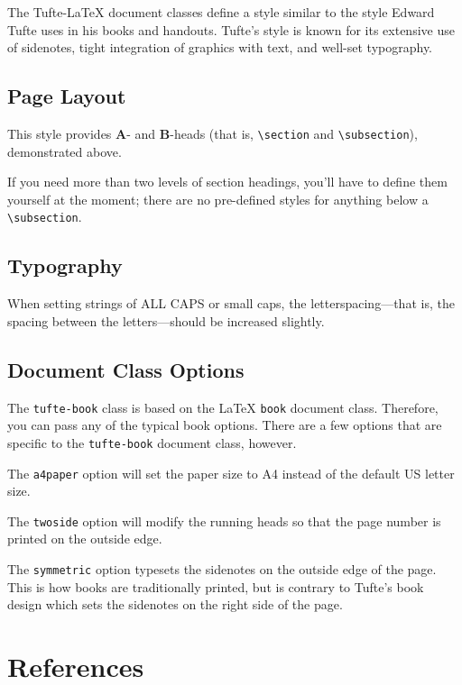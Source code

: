\documentclass[
  twoside,
  symmetric]{tufte-book}
\begin{document}
The Tufte-LaTeX document classes define a style similar to the style
Edward Tufte uses in his books and handouts. Tufte's style is known for
its extensive use of sidenotes, tight integration of graphics with text,
and well-set typography.

\section{Page Layout}\label{page-layout}

This style provides \textbf{A}- and \textbf{B}-heads (that is,
\texttt{\textbackslash{}section} and
\texttt{\textbackslash{}subsection}), demonstrated above.

If you need more than two levels of section headings, you'll have to
define them yourself at the moment; there are no pre-defined styles for
anything below a \texttt{\textbackslash{}subsection}.

\section{Typography}\label{typography}

When setting strings of ALL CAPS or small caps, the letterspacing---that
is, the spacing between the letters---should be increased
slightly\citep{Bringhurst2005}.

\section{Document Class Options}\label{document-class-options}

The \texttt{tufte-book} class is based on the LaTeX \texttt{book}
document class. Therefore, you can pass any of the typical book options.
There are a few options that are specific to the \texttt{tufte-book}
document class, however.

The \texttt{a4paper} option will set the paper size to A4 instead of the
default US letter size.

The \texttt{twoside} option will modify the running heads so that the
page number is printed on the outside edge.

The \texttt{symmetric} option typesets the sidenotes on the outside edge
of the page. This is how books are traditionally printed, but is
contrary to Tufte's book design which sets the sidenotes on the right
side of the page.

\chapter*{References}\label{references}

\renewcommand{\bibsection}{}



\backmatter
\end{document}

